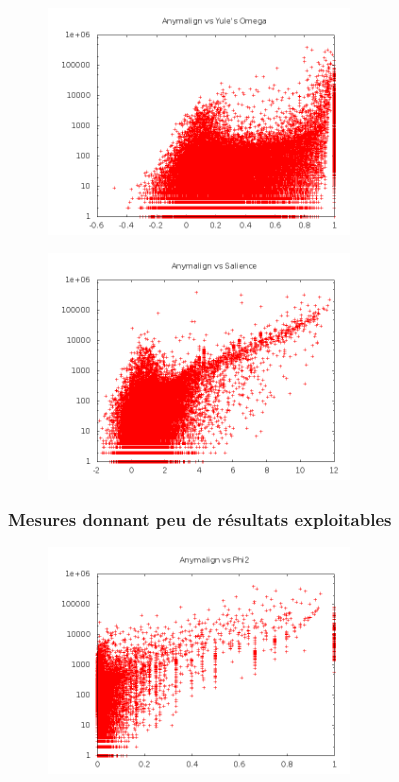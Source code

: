 \documentclass[a4paper,10pt]{article}
\begin{document}
\begin{figure}[!h]
\centering
\includegraphics[width=8cm]{yuleolog.png}
\end{figure}

\begin{figure}[!h]
\centering
\includegraphics[width=8cm]{saliencelog.png}
\end{figure}


\newpage

\subsubsection{Mesures donnant peu de résultats exploitables}
\label{peuexploitables}

\begin{figure}[!h]
\centering
\includegraphics[width=8cm]{phi2log.png}
\end{figure}
\end{document}
